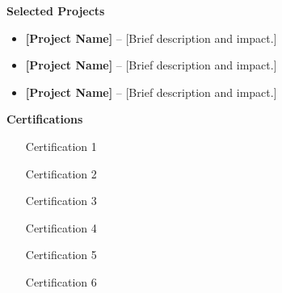 \documentclass[11pt,a4paper]{article}
\begin{document}
\begin{minipage}[t]{0.6\textwidth}
    \raggedright
    \textbf{\color{primary}Selected Projects}
    \begin{itemize}[label={}, leftmargin=10pt, itemsep=2pt]
        \item \textbf{[Project Name]} -- [Brief description and impact.]
        \item \textbf{[Project Name]} -- [Brief description and impact.]
        \item \textbf{[Project Name]} -- [Brief description and impact.]
    \end{itemize}
\end{minipage}%
\begin{minipage}[t]{0.4\textwidth}
    \raggedright
    \textbf{\color{primary}Certifications}
    \begin{itemize}[label=\textbullet, itemsep=2pt]
        \item [Certification 1]
        \item [Certification 2]
        \item [Certification 3]
        \item [Certification 4]
        \item [Certification 5]
        \item [Certification 6]
    \end{itemize}
\end{minipage}
\end{document}
